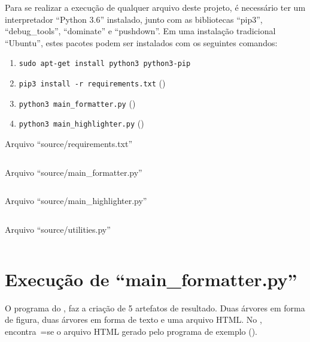 Para se realizar a execução de qualquer arquivo deste projeto,
é necessário ter um interpretador ``Python 3.6'' instalado,
junto com as bibliotecas ``pip3'',
``debug\_tools'', ``dominate'' e
``pushdown''.
Em uma instalação tradicional ``Ubuntu'',
estes pacotes podem ser instalados com os seguintes comandos:
\begin{enumerate}[1)]
\item \texttt{sudo apt-get install python3 python3-pip}
\item \texttt{pip3 install -r requirements.txt} ()
\item \texttt{python3 main_formatter.py} ()
\item \texttt{python3 main_highlighter.py} ()
\end{enumerate}

\begin{code}
\caption{Arquivo ``source/requirements.txt''}
\label{requirementsTxt}
\inputminted{python3}{../source/requirements.txt}
\end{code}

\begin{code}
\caption{Arquivo ``source/main\_formatter.py''}
\label{MainFormatterPy}
\inputminted[firstline=39,firstnumber=1]{python3}{../source/main_formatter.py}
\end{code}

\begin{code}
\caption{Arquivo ``source/main\_highlighter.py''}
\label{MainHighlighterPy}
\inputminted[firstline=39,firstnumber=1]{python3}{../source/main_highlighter.py}
\end{code}

\begin{code}
\caption{Arquivo ``source/utilities.py''}
\label{utilitiesPy}
\inputminted[firstline=39,firstnumber=1]{python3}{../source/utilities.py}
\end{code}


\chapter[main\_formatter.py]{Execução de ``main\_formatter.py''}

O programa do ,
faz a criação de 5 artefatos de resultado.
Duas árvores em forma de figura,
duas árvores em forma de texto e
uma arquivo HTML.
No ,
encontra~=se o arquivo HTML gerado pelo programa de exemplo ().

